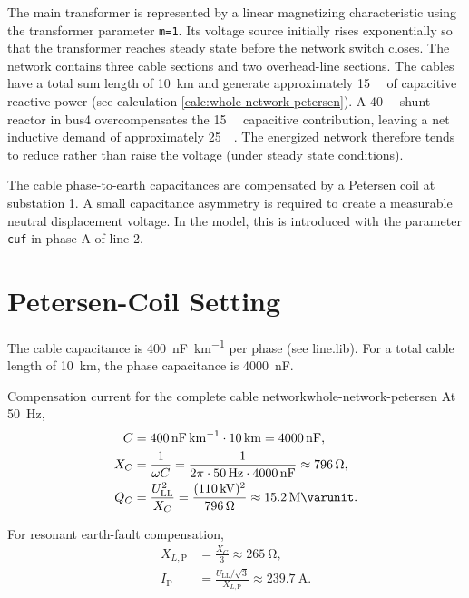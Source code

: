 The main transformer is represented by a linear magnetizing characteristic
using the transformer parameter \texttt{m=1}. Its voltage source initially rises exponentially so that
the transformer reaches steady state before the network switch closes. The network contains three cable sections and two overhead-line sections. The cables have a total sum length of \SI{10}{\kilo\metre} and generate approximately
\SI{15}{\mega\varunit} of capacitive reactive power (see calculation \ref{calc:whole-network-petersen}). A \SI{40}{\mega\varunit} shunt reactor in bus4 overcompensates the \SI{15}{\mega\varunit} capacitive contribution, leaving a net inductive demand of approximately \SI{25}{\mega\varunit}. 
The energized network therefore tends to reduce rather than raise the voltage (under steady state conditions).

The cable phase-to-earth capacitances are compensated by a Petersen coil at
substation 1. A small capacitance asymmetry is required to create a measurable
neutral displacement voltage. In the model, this is introduced with the
parameter \texttt{cuf} in phase A of line 2.


\section{Petersen-Coil Setting}
\label{sec:whole-network-petersen-setting}

The cable capacitance is \SI{400}{\nano\farad\per\kilo\metre} per phase (see line.lib). For a
total cable length of \SI{10}{\kilo\metre}, the phase capacitance is
\SI{4000}{\nano\farad}.

\begin{calculation}{Compensation current for the complete cable network}{whole-network-petersen}
At \SI{50}{\hertz},
\begin{align}
C&=\SI{400}{\nano\farad\per\kilo\metre}\cdot\SI{10}{\kilo\metre}
  =\SI{4000}{\nano\farad},\\
X_C&=\frac{1}{\omega C}
  =\frac{1}{2\pi\cdot\SI{50}{\hertz}\cdot\SI{4000}{\nano\farad}}
  \approx\SI{796}{\ohm},\\
Q_C&=\frac{U_{\mathrm{LL}}^2}{X_C}
  =\frac{(\SI{110}{\kilo\volt})^2}{\SI{796}{\ohm}}
  \approx\SI{15.2}{\mega\varunit}.
\end{align}

For resonant earth-fault compensation,
\begin{align}
X_{L,\mathrm P}&=\frac{X_C}{3}\approx\SI{265}{\ohm},\\
I_{\mathrm P}&=\frac{U_{\mathrm{LL}}/\sqrt{3}}{X_{L,\mathrm P}}
  \approx\boxed{\SI{239.7}{\ampere}}.
\end{align}
\end{calculation}


